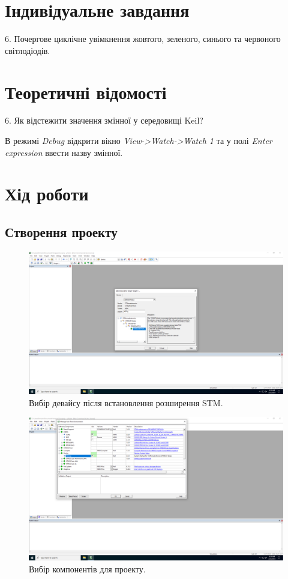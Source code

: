 \documentclass[oneside,14pt]{extarticle}
\begin{document}
\begin{normalsize}
	\section*{Індивідуальне завдання}
	6. Почергове циклічне увімкнення жовтого, зеленого, синього та червоного світлодіодів.

	\section*{Теоретичні відомості}
	6. Як відстежити значення змінної у середовищі Keil?
	
	В режимі \textit{Debug} відкрити вікно \textit{View->Watch->Watch 1} та у полі \textit{Enter expression} ввести назву змінної.
	
	\section*{Хід роботи}
	\subsection*{Створення проекту}
	\begin{figure}[H]
		\centering
		\includegraphics[scale=0.3]{1}
		\caption{Вибір девайсу після встановлення розширення STM.}
	\end{figure}
	
	\begin{figure}[H]
		\centering
		\includegraphics[scale=0.3]{2}
		\caption{Вибір компонентів для проекту.}
	\end{figure}
	

\end{normalsize}
\end{document}
